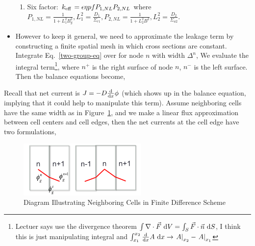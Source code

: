 \documentclass{school-22.211-notes}
\begin{document}
\begin{itemize}
\begin{enumerate}
\item Six factor: $\displaystyle \left. k_{\mathrm{eff}} \right. = \epsilon \eta p f P_{1,NL} P_{2,NL}$ where $\displaystyle P_{1,NL} = \frac{1}{1 + L_1^2 B_g^2}, L_1^2 = \frac{D_1}{\Sigma_{r1}}, P_{2,NL} = \frac{1}{1 + L_2^2 B^2}, L_2^2 = \frac{D_2}{\Sigma_{a2}}$.  

\end{enumerate}

\item However to keep it general, we need to approximate the leakage term by constructing a finite spatial mesh in which cross sections are constant. Integrate Eq.~\ref{two-group-eq} over for node $n$ with width $\Delta^n$,
We evaluate the integral term\footnote{Lectuer says use the divergence theorem $\int \nabla \cdot \vec{F} \mbox{ }\mathrm{d} V = \int_S \vec{F} \cdot \vec{n} \mbox{ }\mathrm{d} S$, I think this is just manipulating integral and $\int_{x_1}^{x_2} \frac{\mathrm{d}}{\mathrm{d}x} A \mbox{ }\mathrm{d} x \to \left. A \right|_{x_2} - \left. A \right|_{x_1}$}, 
where $n^+$ is the right surface of node $n$, $n^-$ is the left surface. Then the balance equations become,

\end{itemize}



Recall that net current is $J = -D \frac{\mathrm{d}}{\mathrm{d}x} \phi$ (which shows up in the balance equation, implying that it could help to manipulate this term). Assume neighboring cells have the same width as in Figure~\ref{diagram-finite-difference}, and we make a linear flux approximation between cell centers and cell edges, then the net currents at the cell edge have two formulations, 
\begin{figure}[ht]
  \centering
  \includegraphics[width=2.5in]{images/dfs/diagram-finite-difference.png}
  \caption{Diagram Illustrating Neighboring Cells in Finite Difference Scheme} \label{diagram-finite-difference}
\end{figure}
\end{document}
